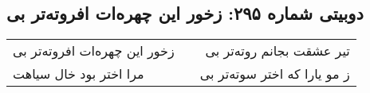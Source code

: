 \begin{center}
\section*{دوبیتی شماره ۲۹۵: زخور این چهره‌ات افروته‌تر بی}
\label{sec:295}
\begin{longtable}{l p{0.5cm} r}
زخور این چهره‌ات افروته‌تر بی
&&
تیر عشقت بجانم روته‌تر بی
\\
مرا اختر بود خال سیاهت
&&
ز مو یارا که اختر سوته‌تر بی
\\
\end{longtable}
\end{center}
